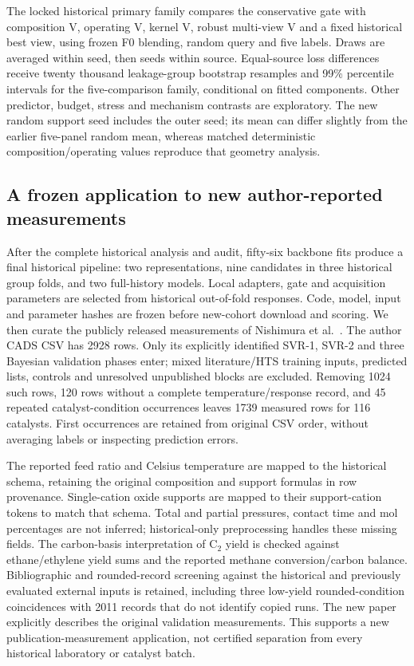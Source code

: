 The locked historical primary family compares the conservative gate with composition V, operating V, kernel V, robust multi-view V and a fixed historical best view, using frozen F0 blending, random query and five labels. Draws are averaged within seed, then seeds within source. Equal-source loss differences receive twenty thousand leakage-group bootstrap resamples and 99\% percentile intervals for the five-comparison family, conditional on fitted components. Other predictor, budget, stress and mechanism contrasts are exploratory. The new random support seed includes the outer seed; its mean can differ slightly from the earlier five-panel random mean, whereas matched deterministic composition/operating values reproduce that geometry analysis.

\subsection{A frozen application to new author-reported measurements}
After the complete historical analysis and audit, fifty-six backbone fits produce a final historical pipeline: two representations, nine candidates in three historical group folds, and two full-history models. Local adapters, gate and acquisition parameters are selected from historical out-of-fold responses. Code, model, input and parameter hashes are frozen before new-cohort download and scoring. We then curate the publicly released measurements of Nishimura et al.\ \cite{nishimura2023new}. The author CADS CSV has 2928 rows. Only its explicitly identified SVR-1, SVR-2 and three Bayesian validation phases enter; mixed literature/HTS training inputs, predicted lists, controls and unresolved unpublished blocks are excluded. Removing 1024 such rows, 120 rows without a complete temperature/response record, and 45 repeated catalyst-condition occurrences leaves 1739 measured rows for 116 catalysts. First occurrences are retained from original CSV order, without averaging labels or inspecting prediction errors.

The reported feed ratio and Celsius temperature are mapped to the historical schema, retaining the original composition and support formulas in row provenance. Single-cation oxide supports are mapped to their support-cation tokens to match that schema. Total and partial pressures, contact time and mol percentages are not inferred; historical-only preprocessing handles these missing fields. The carbon-basis interpretation of C$_2$ yield is checked against ethane/ethylene yield sums and the reported methane conversion/carbon balance. Bibliographic and rounded-record screening against the historical and previously evaluated external inputs is retained, including three low-yield rounded-condition coincidences with 2011 records that do not identify copied runs. The new paper explicitly describes the original validation measurements. This supports a new publication-measurement application, not certified separation from every historical laboratory or catalyst batch.

